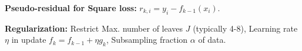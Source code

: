 \documentclass[a4paper,10pt]{article}
\begin{document}
\begin{small}
\textbf{Pseudo-residual for Square loss:} $r_{k,i} = y_i - f_{k-1}(x_i)$.

\textbf{Regularization:} Restrict Max. number of leaves $J$ (typically 4-8), Learning rate $\eta$ in update $f_k = f_{k-1} + \eta g_k$, Subsampling fraction $\alpha$ of data.


\end{small}
\end{document}
